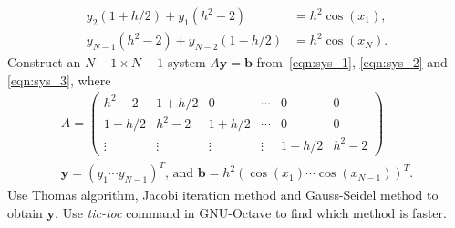 \documentclass[11pt,a4paper,reqno]{article}
\begin{document}
\begin{itemize}
\begin{align}
\label{eqn:sys_2}
y_{2} (1 + h/2) + y_{1} (h^2 - 2) &= h^2\cos(x_1), \\
\label{eqn:sys_3}
y_{N-1} (h^2 - 2) + y_{N-2} (1 - h/2) &= h^2\cos(x_N).
\end{align}
Construct an $N -1 \times N - 1$ system $A{\pmb y} = {\pmb b}$ from~\eqref{eqn:sys_1}, \eqref{eqn:sys_2} and \eqref{eqn:sys_3}, where
\begin{align}
A = \begin{pmatrix}
h^2 - 2 & 1 + h/2 & 0 & \cdots & 0 & 0\\
1-h/2 & h^2 - 2 & 1+h/2 & \cdots & 0 & 0 \\
\vdots & \vdots & \vdots & \vdots & 1-h/2 & h^2 - 2
\end{pmatrix} \\
{\pmb y} = (y_1 \cdots y_{N-1})^T,\,\textrm{and } {\pmb b} = h^2(\cos(x_1) \cdots\cos(x_{N-1}))^T.
\end{align}
Use Thomas algorithm, Jacobi iteration method and Gauss-Seidel method to obtain ${\pmb y}$. Use \emph{tic-toc} command in GNU-Octave to find which method is faster. 
\end{itemize}
\end{document}
